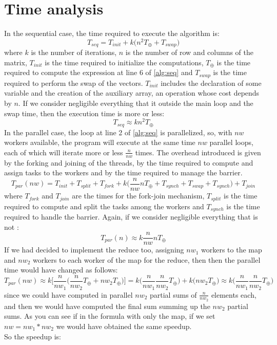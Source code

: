 \documentclass[12pt]{article}
\begin{document}
	\section{Time analysis}
	In the sequential case, the time required to execute the algorithm is:
	\[ T_{seq} = T_{init} + k\Big(n^2T_\oplus + T_{swap}\Big) \]
	where $k$ is the number of iterations, $n$ is the number of row and columns of the matrix, $T_{init}$ is the time required to initialize the computations, $T_\oplus$ is the time required to compute the expression at line 6 of \ref{alg:seq} and $T_{swap}$ is the time required to perform the swap of the vectors. $T_{init}$ includes the declaration of some variable and the creation of the auxiliary array, an operation whose cost depends by $n$. If we consider negligible everything that it outside the main loop and the swap time, then the execution time is more or less: 
	\[ T_{seq} \approx kn^2T_\oplus \]
	In the parallel case, the loop at line 2 of \ref{alg:seq} is parallelized, so, with $nw$ workers available, the program will execute at the same time $nw$ parallel loops, each of which will iterate more or less $\frac{n}{nw}$ times. The overhead introduced is given by the forking and joining of the threads, by the time required to compute and assign tasks to the workers and by the time required to manage the barrier.
	\[T_{par}(nw) = T_{init} + T_{split} + T_{fork} + k\Big(\frac{n}{nw}nT_\oplus + T_{synch} + T_{swap} + T_{synch}\Big) + T_{join} \]
	where $T_{fork}$ and $T_{join}$ are the times for the fork-join mechanism, $T_{split}$ is the time required to compute and split the tasks among the workers and $T_{synch}$ is the time required to handle the barrier. Again, if we consider negligible everything that is not :
	\[T_{par}(n) \approx k\frac{n}{nw}nT_\oplus \]
	If we had decided to implement the reduce too, assigning $nw_1$ workers to the map and $nw_2$ workers to each worker of the map for the reduce, then then the parallel time would have changed as follows:
	\[ T_{par}(nw) \approx k\Big[\frac{n}{nw_1}\Big(\frac{n}{nw_2}T_\oplus + nw_2T_\oplus \Big) \Big] = k\Big(\frac{n}{nw_1}\frac{n}{nw_2}T_\oplus\Big) + k\Big(nw_2T_\oplus\Big) \approx k\Big(\frac{n}{nw_1}\frac{n}{nw_2}T_\oplus\Big)\]
	since we could have computed in parallel $nw_2$ partial sums of $\frac{n}{nw_2}$ elements each, and then we would have computed the final sum summing up the $nw_2$ partial sums. As you can see if in the formula with only the map, if we set $nw = nw_1*nw_2$ we would have obtained the same speedup.\\
	So the speedup is:
\end{document}
